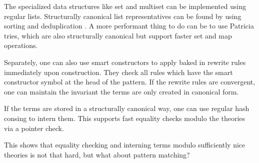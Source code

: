 \documentclass[sigconf]{acmart}
\begin{document}




The specialized data structures like set and multiset can be implemented using regular lists. Structurally canonical list representatives can be found by using sorting and deduplication \cite{hashingmodtheories}. A more performant thing to do can be to use Patricia tries, which are also structurally canonical but support faster set and map operations.

Separately, one can also use smart constructors \cite{smartconstructor} to apply baked in rewrite rules immediately upon construction. They check all rules which have the smart constructor symbol at the head of the pattern. If the rewrite rules are convergent, one can maintain the invariant the terms are only created in canonical form. %

If the terms are stored in a structurally canonical way, one can use regular hash consing \cite{hashconsing} to intern them. This supports fast equality checks modulo the theories via a pointer check.

This shows that equality checking and interning terms modulo sufficiently nice theories is not that hard, but what about pattern matching?


\end{document}
